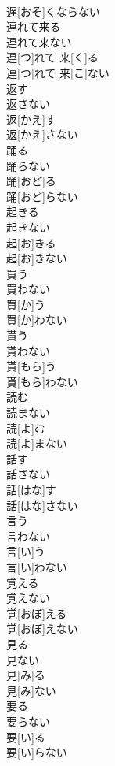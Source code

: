 \documentclass[8pt]{extreport}
\begin{document}
\begin{CJK}{UTF8}{min}
\\	遅[おそ]くならない
\\	連れて来る 
\\	連れて来ない	
\\	連[つ]れて 来[く]る 
\\	連[つ]れて 来[こ]ない
\\	返す 
\\	返さない	
\\	返[かえ]す 
\\	返[かえ]さない
\\	踊る 
\\	踊らない	
\\	踊[おど]る 
\\	踊[おど]らない
\\	起きる 
\\	起きない	
\\	起[お]きる 
\\	起[お]きない
\\	買う 
\\	買わない	
\\	買[か]う 
\\	買[か]わない
\\	貰う 
\\	貰わない	
\\	貰[もら]う 
\\	貰[もら]わない
\\	読む 
\\	読まない	
\\	読[よ]む 
\\	読[よ]まない
\\	話す 
\\	話さない	
\\	話[はな]す 
\\	話[はな]さない
\\	言う 
\\	言わない	
\\	言[い]う 
\\	言[い]わない
\\	覚える 
\\	覚えない	
\\	覚[おぼ]える 
\\	覚[おぼ]えない
\\	見る 
\\	見ない	
\\	見[み]る 
\\	見[み]ない
\\	要る 
\\	要らない	
\\	要[い]る 
\\	要[い]らない 

\end{CJK}
\end{document}
